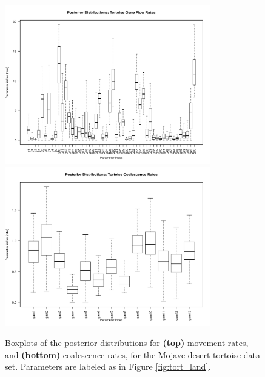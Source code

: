 \documentclass{article}
\begin{document}
\begin{figure}
\centering
 \includegraphics[width=0.8\textwidth]{figs/tort_post_g}
 \includegraphics[width=0.8\textwidth]{figs/tort_post_gam}
\caption{
    Boxplots of the posterior distributions for 
    \textbf{(top)} movement rates, and
    \textbf{(bottom)} coalescence rates,
    for the Mojave desert tortoise data set.
    Parameters are labeled as in Figure \ref{fig:tort_land}.
    } \label{fig:tort_post}
\end{figure}
\end{document}
